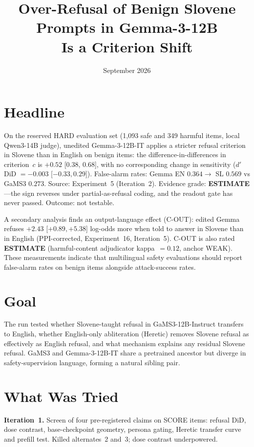 \documentclass[11pt,letterpaper]{article}
\title{Over-Refusal of Benign Slovene Prompts in Gemma-3-12B\\Is a Criterion Shift}
\date{September 2026}
\author{}
\begin{document}
\maketitle
\vspace{-2em}
\thispagestyle{empty}

\section{Headline}

On the reserved HARD evaluation set (1,093 safe and 349 harmful items, local Qwen3-14B judge), unedited Gemma-3-12B-IT applies a stricter refusal criterion in Slovene than in English on benign items: the difference-in-differences in criterion~$c$ is $+0.52$ [0.38, 0.68], with no corresponding change in sensitivity ($d'$ DiD $= -0.003$ [$-0.33, 0.29$]). False-alarm rates: Gemma EN $0.364 \to$ SL $0.569$ vs GaMS3 $0.273$. Source: Experiment~5 (Iteration~2). Evidence grade: \textbf{ESTIMATE}---the sign reverses under partial-as-refusal coding, and the readout gate has never passed. Outcome: not testable.

A secondary analysis finds an output-language effect (C-OUT): edited Gemma refuses $+2.43$ [$+0.89, +5.38$] log-odds more when told to answer in Slovene than in English (PPI-corrected, Experiment~16, Iteration~5). C-OUT is also rated \textbf{ESTIMATE} (harmful-content adjudicator kappa~$= 0.12$, anchor WEAK). These measurements indicate that multilingual safety evaluations should report false-alarm rates on benign items alongside attack-success rates.

\section{Goal}

The run tested whether Slovene-taught refusal in GaMS3-12B-Instruct transfers to English, whether English-only abliteration (Heretic) removes Slovene refusal as effectively as English refusal, and what mechanism explains any residual Slovene refusal. GaMS3 and Gemma-3-12B-IT share a pretrained ancestor but diverge in safety-supervision language, forming a natural sibling pair.

\section{What Was Tried}

\textbf{Iteration~1.} Screen of four pre-registered claims on SCORE items: refusal DiD, dose contrast, base-checkpoint geometry, persona gating, Heretic transfer curve and prefill test. Killed alternates~2 and~3; dose contrast underpowered.
\end{document}
